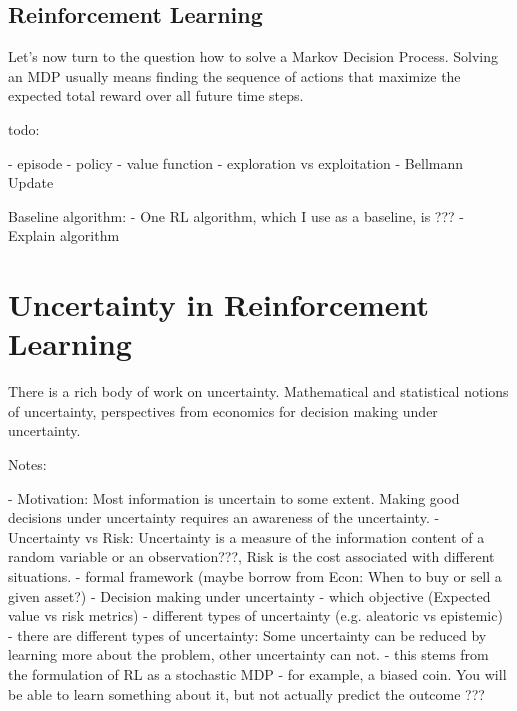 \subsection{Reinforcement Learning}

Let's now turn to the question how to solve a Markov Decision Process. Solving an MDP usually means finding the sequence of actions that maximize the expected total reward over all future time steps.

todo:

- episode
- policy
- value function
- exploration vs exploitation
- Bellmann Update


Baseline algorithm: 
- One RL algorithm, which I use as a baseline, is ???
- Explain algorithm



\section{Uncertainty in Reinforcement Learning}
There is a rich body of work on uncertainty. Mathematical and statistical notions of uncertainty, perspectives from economics for decision making under uncertainty.

Notes:

- Motivation: Most information is uncertain to some extent. Making good decisions under uncertainty requires an awareness of the uncertainty.
- Uncertainty vs Risk: Uncertainty is a measure of the information content of a random variable or an observation???, Risk is the cost associated with different situations.
- formal framework (maybe borrow from Econ: When to buy or sell a given asset?)
- Decision making under uncertainty
    - which objective (Expected value vs risk metrics)
- different types of uncertainty (e.g. aleatoric vs epistemic)
    - there are different types of uncertainty: Some uncertainty can be reduced by learning more about the problem, other uncertainty can not.
    - this stems from the formulation of RL as a stochastic MDP
    - for example, a biased coin. You will be able to learn something about it, but not actually predict the outcome ???

